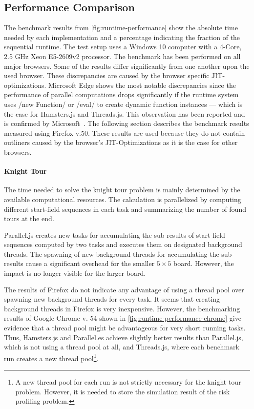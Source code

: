 \subsection{Performance Comparison}
The benchmark results from \cref{fig:runtime-performance} show the absolute time needed by each implementation and a percentage indicating the fraction of the sequential runtime. The test setup uses a Windows 10 computer with a 4-Core, 2.5 GHz Xeon E5-2609v2 processor. The benchmark has been performed on all major browsers. Some of the results differ significantly from one another upon the used browser. These discrepancies are caused by the browser specific JIT-optimizations. Microsoft Edge shows the most notable discrepancies since the performance of parallel computations drops significantly if the runtime system uses \javascriptinline/new Function/ or \javascriptinline/eval/ to create dynamic function instances --- which is the case for Hamsters.js and Threads.js. This observation has been reported and is confirmed by Microsoft~\cite{newFunctionWebWorkerEdge}. The following section describes the benchmark results measured using Firefox v.50. These results are used because they do not contain outliners caused by the browser's JIT-Optimizations as it is the case for other browsers.

\begin{figure*}
		
	\caption{Runtime Performance of Parallelization Problems Relative to Sequential Execution}
	\label{fig:runtime-performance}
\end{figure*}


\paragraph{Knight Tour} The time needed to solve the knight tour problem is mainly determined by the available computational resources. The calculation is parallelized by computing different start-field sequences in each task and summarizing the number of found tours at the end. 

Parallel.js creates new tasks for accumulating the sub-results of start-field sequences computed by two tasks and executes them on designated background threads. The spawning of new background threads for accumulating the sub-results cause a significant overhead for the smaller $5\times5$ board. However, the impact is no longer visible for the larger board.

The results of Firefox do not indicate any advantage of using a thread pool over spawning new background threads for every task. It seems that creating background threads in Firefox is very inexpensive. However, the benchmarking results of Google Chrome v. 54 shown in \cref{fig:runtime-performance-chrome} give evidence that a thread pool might be advantageous for very short running tasks. Thus, Hamsters.js and Parallel.es achieve slightly better results than Parallel.js, which is not using a thread pool at all, and Threads.js, where each benchmark run creates a new thread pool\footnote{A new thread pool for each run is not strictly necessary for the knight tour problem. However, it is needed to store the simulation result of the risk profiling problem.}. 


